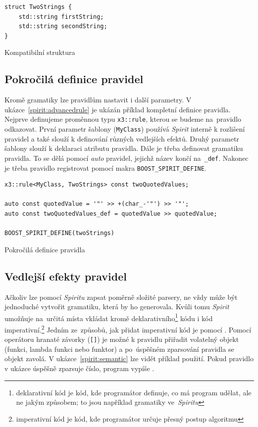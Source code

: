 \documentclass[thesis=B,czech,hidelinks]{FITthesis}[2019/03/06]
\begin{document}
\begin{listing}
\begin{verbatim}
struct TwoStrings {
    std::string firstString;
    std::string secondString;
}
\end{verbatim}
\caption{Kompatibilní struktura}\label{spirit:struct}
\end{listing}

\subsection{Pokročilá definice pravidel}\label{advanced:rules}
Kromě gramatiky lze pravidlům nastavit i další parametry. V ukázce~\ref{spirit:advancedrule} je ukázán příklad kompletní definice pravidla. Nejprve definujeme proměnnou typu \texttt{x3::rule}, kterou se budeme na~pravidlo odkazovat. První parametr šablony (\texttt{MyClass}) používá \textit{Spirit} interně k rozlišení pravidel a také slouží k definování různých vedlejších efektů. Druhý parametr šablony slouží k deklaraci atributu pravidla. Dále je třeba definovat gramatiku pravidla. To se dělá pomocí \textit{auto} pravidel, jejichž název končí na~\verb¨_def¨. Nakonec je třeba pravidlo registrovat pomocí makra \verb¨BOOST_SPIRIT_DEFINE¨.

\begin{listing}
\begin{verbatim}
x3::rule<MyClass, TwoStrings> const twoQuotedValues;

auto const quotedValue = '"' >> +(char_-'"') >> '"';
auto const twoQuotedValues_def = quotedValue >> quotedValue;

BOOST_SPIRIT_DEFINE(twoStrings)
\end{verbatim}
\caption{Pokročilá definice pravidla}\label{spirit:advancedrule}
\end{listing}

\subsection{Vedlejší efekty pravidel}\label{sideeffects}
Ačkoliv lze pomocí \textit{Spiritu} zapsat poměrně složité parsery, ne vždy může být jednoduché vytvořit gramatiku, která by ho generovala. Kvůli tomu \textit{Spirit} umožňuje na~určitá místa vkládat kromě deklarativního\footnote{deklarativní kód je kód, kde programátor definuje, co má program udělat, ale ne jakým způsobem; to jsou například gramatiky ve~\textit{Spiritu}} kódu i kód imperativní.\footnote{imperativní kód je kód, kde programátor určuje přesný postup algoritmu} Jedním ze~způsobů, jak přidat imperativní kód je pomocí . Pomocí operátoru hranaté závorky (\verb¨[]¨) je možné k pravidlu přiřadit volatelný objekt (funkci, lambda funkci nebo funktor) a po~úspěšném zparsování pravidla se objekt zavolá. V ukázce~\ref{spirit:semantic} lze vidět příklad použití. Pokud pravidlo v ukázce úspěšně zparsuje číslo, program vypíše .
\end{document}
